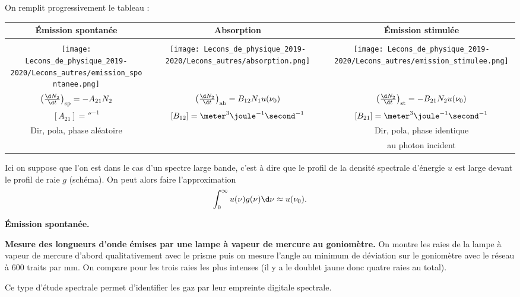 On remplit progressivement le tableau :
\begin{table}[!h]
\center
\begin{tabular}{c|c|c}
Émission spontanée & Absorption & Émission stimulée \\
\hline \hline \\
\texttt{[image: Lecons\_de\_physique\_2019-2020/Lecons\_autres/emission\_spontanee.png]} & \texttt{[image: Lecons\_de\_physique\_2019-2020/Lecons\_autres/absorption.png]} & \texttt{[image: Lecons\_de\_physique\_2019-2020/Lecons\_autres/emission\_stimulee.png]} \\
$\left(\frac{\d N_2}{\d t}\right)_\mathrm{sp} = -A_{21} N_2$ & $\left(\frac{\d N_2}{\d t}\right)_\mathrm{ab} = B_{12} N_1 u(\nu_0)$ & $\left(\frac{\d N_2}{\d t}\right)_\mathrm{st} = -B_{21} N_2 u(\nu_0)$ \\
$[A_{21}] = \second^{-1}$ & $[B_{12}] = \meter^3\joule^{-1}\second^{-1}$ & $[B_{21}] = \meter^3\joule^{-1}\second^{-1}$ \\
Dir, pola, phase aléatoire & & Dir, pola, phase identique \\
						   & & au photon incident 
\end{tabular}
\end{table}

Ici on suppose que l'on est dans le cas d'un spectre large bande, c'est à dire que le profil de la densité spectrale d'énergie $u$ est large devant le profil de raie $g$ (schéma).
On peut alors faire l'approximation
\begin{equation}
\int_0^\infty u(\nu) g(\nu) \d \nu \approx u(\nu_0).
\end{equation}

\begin{slide}
\textbf{Émission spontanée.}
\end{slide}

\begin{experience}
\textbf{Mesure des longueurs d'onde émises par une lampe à vapeur de mercure au goniomètre.}
On montre les raies de la lampe à vapeur de mercure d'abord qualitativement avec le prisme puis on mesure l'angle au minimum de déviation sur le goniomètre avec le réseau à 600 traits par mm.
On compare pour les trois raies les plus intenses (il y a le doublet jaune donc quatre raies au total).
\end{experience}

Ce type d'étude spectrale permet d'identifier les gaz par leur empreinte digitale spectrale.

